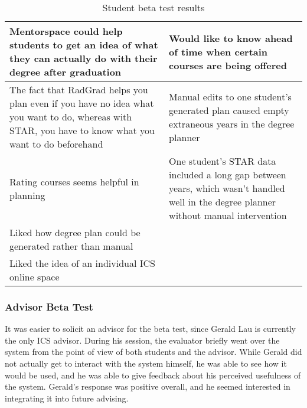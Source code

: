 \begin{table}[htbp!]
\begin{tabular}{ |p{8cm}|p{8cm}|}
 \hline
Mentorspace could help students to get an idea of what they can actually do with their degree after graduation &Would like to know ahead of time when certain courses are being offered\\
 \hline
The fact that RadGrad helps you plan even if you have no idea what you want to do, whereas with STAR, you have to know what you want to do beforehand & Manual edits to one student's generated plan caused empty extraneous years in the degree planner\\
 \hline
Rating courses seems helpful in planning & One student's STAR data included a long gap between years, which wasn't handled well in the degree planner without manual intervention\\
 \hline
Liked how degree plan could be generated rather than manual &\\
 \hline
Liked the idea of an individual ICS online space &\\
 \hline
\end{tabular}
\caption{Student beta test results}
\label{table:student-beta-test-results}
\end{table}

\subsubsection{Advisor Beta Test}

It was easier to solicit an advisor for the beta test, since Gerald Lau is currently the only ICS advisor. During his session, the evaluator briefly went over the system from the point of view of both students and the advisor. While Gerald did not actually get to interact with the system himself, he was able to see how it would be used, and he was able to give feedback about his perceived usefulness of the system. Gerald's response was positive overall, and he seemed interested in integrating it into future advising.